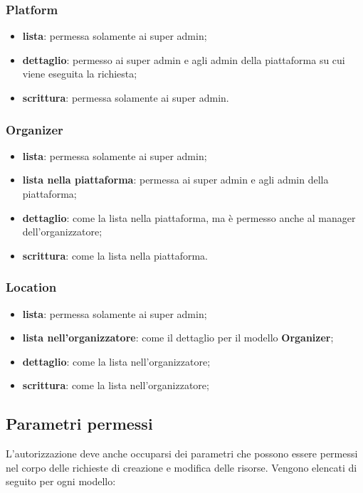 \subsubsection{Platform}
\begin{itemize}
	\item \textbf{lista}: permessa solamente ai super admin;
	\item \textbf{dettaglio}: permesso ai super admin e agli admin della piattaforma su cui viene eseguita la richiesta;
	\item \textbf{scrittura}: permessa solamente ai super admin.
\end{itemize}

\subsubsection{Organizer}
\begin{itemize}
	\item \textbf{lista}: permessa solamente ai super admin;
	\item \textbf{lista nella piattaforma}: permessa ai super admin e agli admin della piattaforma;
	\item \textbf{dettaglio}: come la lista nella piattaforma, ma è permesso anche al manager dell'organizzatore;
	\item \textbf{scrittura}: come la lista nella piattaforma.
\end{itemize}

\subsubsection{Location}
\begin{itemize}
	\item \textbf{lista}: permessa solamente ai super admin;
	\item \textbf{lista nell'organizzatore}: come il dettaglio per il modello \textbf{Organizer};
	\item \textbf{dettaglio}: come la lista nell'organizzatore;
	\item \textbf{scrittura}: come la lista nell'organizzatore;
\end{itemize}

\subsection{Parametri permessi}
L'autorizzazione deve anche occuparsi dei parametri che possono essere permessi nel corpo delle richieste di creazione e modifica delle risorse. Vengono elencati di seguito per ogni modello:


